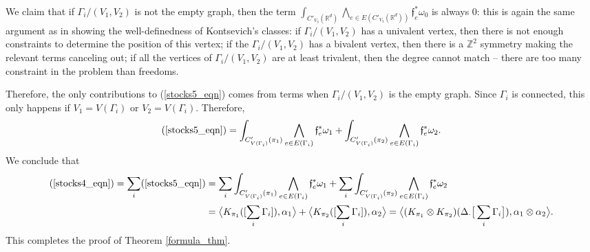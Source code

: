 \documentclass[11pt]{article}
\theoremstyle{definition}
\theoremstyle{remark}
\def\Z{\mathbb{Z}}
\def\R{\mathbb{R}}
\def\ff{\mathfrak{f}}
\begin{document}
We claim that if $\Gamma_i/(V_1,V_2)$ is not the empty graph, then the term $\int_{C'_{V_3}(\R^d)}\bigwedge_{e\in E(C'_{V_3}(\R^d))}\ff_e^*\omega_0$ is always 0: this is again the same argument as in showing the well-definedness of Kontsevich's classes: if $\Gamma_i/(V_1,V_2)$ has a univalent vertex, then there is not enough constraints to determine the position of this vertex; if the $\Gamma_i/(V_1,V_2)$ has a bivalent vertex, then there is a $\Z^2$ symmetry making the relevant terms canceling out; if all the vertices of $\Gamma_i/(V_1,V_2)$ are at least trivalent, then the degree cannot match -- there are too many constraint in the problem than freedoms. 

Therefore, the only contributions to (\ref{stocks5_eqn}) comes from terms when $\Gamma_i/(V_1,V_2)$ is the empty graph. Since $\Gamma_i$ is connected, this only happens if $V_1=V(\Gamma_i)$ or $V_2=V(\Gamma_i)$. Therefore, 
$$(\ref{stocks5_eqn})=
\int_{C'_{V(\Gamma_i)}(\pi_1)}\bigwedge_{e\in E(\Gamma_i)}\ff_e^*\omega_1+
\int_{C'_{V(\Gamma_i)}(\pi_2)}\bigwedge_{e\in E(\Gamma_i)}\ff_e^*\omega_2.$$
We conclude that 
\begin{align*}
(\ref{stocks4_eqn})=\sum_i(\ref{stocks5_eqn})&
=\sum_i\int_{C'_{V(\Gamma_i)}(\pi_1)}\bigwedge_{e\in E(\Gamma_i)}\ff_e^*\omega_1+ \sum_i\int_{C'_{V(\Gamma_i)}(\pi_2)}\bigwedge_{e\in E(\Gamma_i)}\ff_e^*\omega_2\\
&=\big\langle K_{\pi_1}([\sum_i\Gamma_i]),\alpha_1\big\rangle
+\big\langle K_{\pi_2}([\sum_i\Gamma_i]),\alpha_2\big\rangle
=\big\langle (K_{\pi_1}\otimes K_{\pi_2})(\Delta_{\cdot}\big[\sum_{i}\Gamma_i\big]), \alpha_1\otimes\alpha_2 \big\rangle. 
\end{align*}
This completes the proof of Theorem \ref{formula_thm}. 
\end{document}
